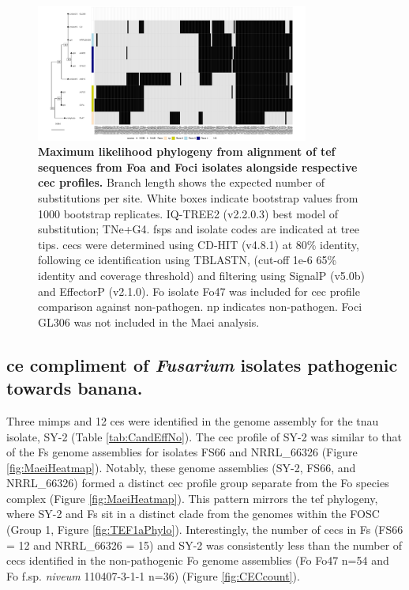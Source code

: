 \begin{figure}
    \centering
    \includegraphics[width=0.8\textwidth]{Figures/HeatmapAndPhylo_ApiiAndCoriandriiOnly.png}
    \captionsetup{width=20cm}
    \caption[Maximum likelihood phylogeny from alignment of \Acl{tef} sequences from \acl{Foa} and \acl{Foci} isolates alongside respective \acl{cec} profiles.]{\textbf{Maximum likelihood phylogeny from alignment of \Acf{tef} sequences from \acf{Foa} and \acf{Foci} isolates alongside respective \acf{cec} profiles.} Branch length shows the expected number of substitutions per site. White boxes indicate bootstrap values from 1000 bootstrap replicates. IQ-TREE2 (v2.2.0.3) best model of substitution; TNe+G4. \Acfp{fsp} and isolate codes are indicated at tree tips. \Acp{cec} were determined using CD-HIT (v4.8.1) at 80\% identity, following \ac{ce} identification using TBLASTN, (cut-off 1e-6 65\% identity and coverage threshold) and filtering using SignalP (v5.0b) and EffectorP (v2.1.0). \ac{Fo} isolate Fo47 was included for \ac{cec} profile comparison against non-pathogen. np indicates non-pathogen. \ac{Foci} GL306 was not included in the \ac{Maei} analysis.}
    \label{fig:Maei_celeryandcoriander}
\end{figure}


\subsection{\Acl{ce} compliment of \textit{Fusarium} isolates pathogenic towards banana.} 

 Three \acp{mimp} and 12 \acp{ce} were identified in the genome assembly for the \ac{tnau} isolate, SY-2 (Table \ref{tab:CandEffNo}). The \ac{cec} profile of SY-2 was similar to that of the \ac{Fs} genome assemblies for isolates FS66 and NRRL\_66326 (Figure \ref{fig:MaeiHeatmap}). Notably, these genome assemblies (SY-2, FS66, and NRRL\_66326) formed a distinct \ac{cec} profile group separate from the \ac{Fo} species complex (Figure \ref{fig:MaeiHeatmap}). This pattern mirrors the \ac{tef} phylogeny, where SY-2 and \ac{Fs} sit in a distinct clade from the genomes within the \ac{FOSC} (Group 1, Figure \ref{fig:TEF1aPhylo}). Interestingly, the number of \acp{cec} in \ac{Fs} (FS66 = 12 and NRRL\_66326 = 15) and SY-2 was consistently less than the number of \acp{cec} identified in the non-pathogenic \ac{Fo} genome assemblies (\ac{Fo} Fo47 n=54 and \ac{Fo} f.sp. \textit{niveum} 110407-3-1-1 n=36) (Figure \ref{fig:CECcount}).
 
